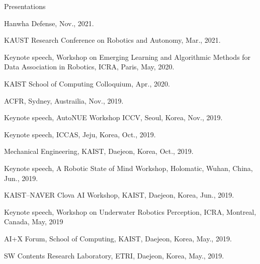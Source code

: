 \begin{rSection}{Presentations}
\begin{pubSubsectionNum}{}
  \item Hanwha Defense, Nov., 2021.



  \item KAUST Research Conference on Robotics and Autonomy, Mar., 2021.


  \item Keynote speech, Workshop on Emerging Learning and Algorithmic Methods for Data Association in Robotics, ICRA, Paris, May, 2020.

  \item KAIST School of Computing Colloquium, Apr., 2020.


  \item \ac{ACFR}, Sydney, Austrailia, Nov., 2019.

  \item Keynote speech, AutoNUE Workshop \ac{ICCV}, Seoul, Korea,  Nov., 2019.

  \item Keynote speech, \ac{ICCAS}, Jeju, Korea, Oct., 2019.

  \item Mechanical Engineering, \ac{KAIST}, Daejeon, Korea, Oct., 2019.

  \item Keynote speech, A Robotic State of Mind Workshop, Holomatic, Wuhan, China, Jun., 2019.

  \item KAIST--NAVER Clova AI Workshop, \ac{KAIST}, Daejeon, Korea, Jun., 2019.

  \item Keynote speech, Workshop on Underwater Robotics Perception, ICRA, Montreal, Canada, May, 2019

  \item AI+X Forum, School of Computing, \ac{KAIST}, Daejeon, Korea, May., 2019.

  \item SW Contents Research Laboratory, \ac{ETRI}, Daejeon, Korea, May., 2019.


\end{pubSubsectionNum}
\end{rSection}
